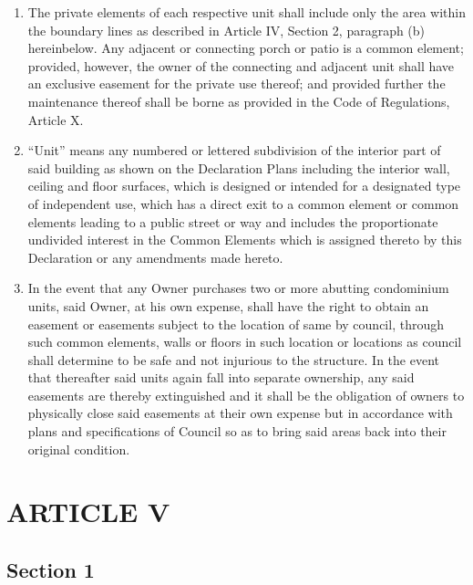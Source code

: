 \documentclass[
  14pt,
]{book}
\begin{document}
\begin{enumerate}
\def\labelenumi{(\alph{enumi})}
\item
  The private elements of each respective unit shall include only the area within the boundary lines as described in Article IV, Section 2, paragraph (b) hereinbelow. Any adjacent or connecting porch or patio is a common element; provided, however, the owner of the connecting and adjacent unit shall have an exclusive easement for the private use thereof; and provided further the maintenance thereof shall be borne as provided in the Code of Regulations, Article X.
\item
  ``Unit'' means any numbered or lettered subdivision of the interior part of said building as shown on the Declaration Plans including the interior wall, ceiling and floor surfaces, which is designed or intended for a designated type of independent use, which has a direct exit to a common element or common elements leading to a public street or way and includes the proportionate undivided interest in the Common Elements which is assigned thereto by this Declaration or any amendments made hereto.
\item
  In the event that any Owner purchases two or more abutting condominium units, said Owner, at his own expense, shall have the right to obtain an easement or easements subject to the location of same by council, through such common elements, walls or floors in such location or locations as council shall determine to be safe and not injurious to the structure. In the event that thereafter said units again fall into separate ownership, any said easements are thereby extinguished and it shall be the obligation of owners to physically close said easements at their own expense but in accordance with plans and specifications of Council so as to bring said areas back into their original condition.
\end{enumerate}

\hypertarget{article-v}{%
\section*{ARTICLE V}\label{article-v}}

\hypertarget{section-1-1}{%
\subsection*{Section 1}\label{section-1-1}}
\end{document}
